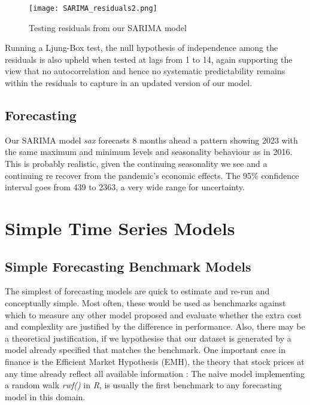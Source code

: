 \documentclass[9pt,technote]{IEEEtran}
\begin{document}
\begin{figure}[htbp]
\centerline{\texttt{[image: SARIMA\_residuals2.png]}}
\caption{Testing residuals from our SARIMA model}
\label{fig:SARIMA_residuals}
\end{figure}

Running a Ljung-Box test, the null hypothesis of independence among the residuals is also upheld when tested at lags from 1 to 14, again supporting the view that no autocorrelation and hence no systematic predictability remains within the residuals to capture in an updated version of our model.  


\subsection{Forecasting}

Our SARIMA model \textit{sax} forecasts 8 months ahead a pattern showing 2023 with the same maximum and minimum levels and seasonality behaviour as in 2016.   This is probably realistic, given the continuing seasonality we see and a continuing re recover from the pandemic's economic effects. The 95\% confidence interval goes from 439 to 2363, a very wide range for uncertainty.  

\section{Simple Time Series Models}

\subsection{Simple Forecasting Benchmark Models}

The simplest of forecasting models are quick to estimate and re-run and conceptually simple.  Most often, these would be used as benchmarks against which to measure any other model proposed and evaluate whether the extra cost and complexlity are justified by the difference in performance.  Also, there may be a theoretical justification, if we hypothesise that our dataset is generated by a model already specified that matches the benchmark.  One important case in finance is the Efficient Market Hypothesis (EMH), the theory that stock prices at any time already reflect all available information \cite{fama1965b}: The naive model implementing a random walk \textit{rwf()} in \textit{R}, is usually the first benchmark to any forecasting model in this domain.  
\end{document}
